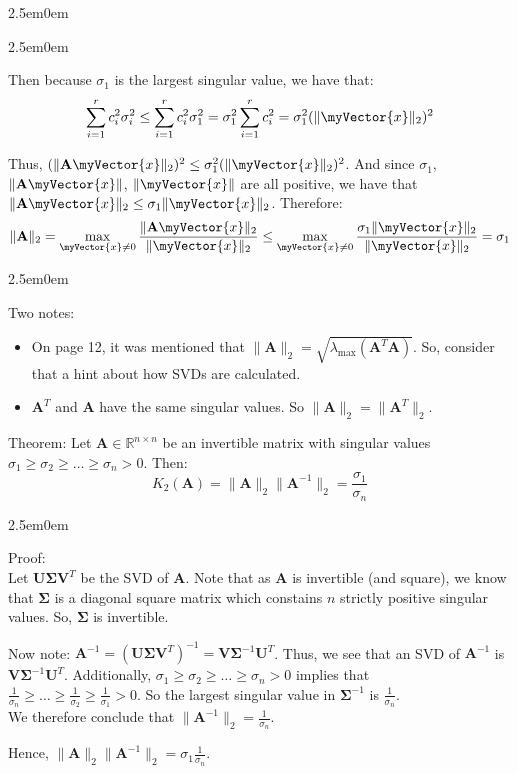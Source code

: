 \documentclass{book}
\newcommand{\hThree}{%
   \color{PineGreen}
   \fontsize{13}{15}\selectfont%
}
\newcommand{\hFour}{%
   \color{Cerulean}
   \fontsize{12}{14}\selectfont%
}
\newenvironment{myIndent}{%
   \begin{adjustwidth}{2.5em}{0em}%
}{%
   \end{adjustwidth}%
}
\newcommand{\uuline}[2][.]{%
{\vphantom{a}\color{#1}%
\rlap{\rule[-0.18em]{\widthof{#2}}{0.06em}}%
\rlap{\rule[-0.32em]{\widthof{#2}}{0.06em}}}%
#2}
\newcommand{\retTwo}{\hfill\bigbreak}
\newcommand{\mVec}[1]{\myVector{#1}}
\newcommand{\mMat}[1]{\mathbf{#1}}
\begin{document}
{\begin{myIndent}
{\begin{myIndent}
      Then because $\sigma_1$ is the largest singular value, we have that:
      \[\sum\limits_{i=1}^r{c_i^2\sigma_i^2} \leq \sum\limits_{i=1}^r{c_i^2\sigma_1^2} = \sigma_1^2\sum\limits_{i=1}^r{c_i^2} = \sigma_1^2(\|\mVec{x}\|_2)^2 \]

      Thus, $(\|\mMat{A}\mVec{x}\|_2)^2 \leq \sigma_1^2(\|\mVec{x}\|_2)^2$. And since $\sigma_1$, $\|\mMat{A}\mVec{x}\|$, $\|\mVec{x}\|$ are all positive, we have that $\|\mMat{A}\mVec{x}\|_2 \leq \sigma_1\|\mVec{x}\|_2$. Therefore:
      \[\|\mMat{A}\|_2 = \max\limits_{\mVec{x} \neq 0}{\frac{\|\mMat{A}\mVec{x}\|_2}{\|\mVec{x}\|_2}} \leq \max\limits_{\mVec{x} \neq 0}{\frac{\sigma_1\|\mVec{x}\|_2}{\|\mVec{x}\|_2}} = \sigma_1\]

      
      {\begin{myIndent} \hFour
         Two notes:
         \begin{itemize}
            \item On page 12, it was mentioned that $\| \mMat{A} \|_2 = \sqrt{\lambda_{\max}(\mMat{A}^T\mMat{A})}$. So, consider that a hint about how SVDs are calculated.
            
            \item $\mMat{A}^T$ and $\mMat{A}$ have the same singular values. So $\|\mMat{A}\|_2 = \|\mMat{A}^T\|_2$.
         \end{itemize}
      \end{myIndent}}
      \end{myIndent}}
      \retTwo

      \uuline{Theorem}: Let $\mMat{A} \in \mathbb{R}^{n \times n}$ be an invertible matrix with singular values\\ $\sigma_1 \geq \sigma_2 \geq \ldots \geq \sigma_n > 0$. Then:
      \[K_2(\mMat{A}) = \|\mMat{A}\|_2\|\mMat{A}^{-1}\|_2 = \frac{\sigma_1}{\sigma_n}\]

      
      {\begin{myIndent} \hThree
         Proof:\\
         Let $\mMat{U}\bm{\Sigma}\mMat{V}^T$ be the SVD of $\mMat{A}$. Note that as $\mMat{A}$ is invertible (and square), we know that $\bm{\Sigma}$ is a diagonal square matrix which constains $n$ strictly positive singular values. So, $\bm{\Sigma}$ is invertible. \retTwo

         Now note: $\mMat{A}^{-1} = (\mMat{U}\bm{\Sigma}\mMat{V}^T)^{-1} = \mMat{V}\bm{\Sigma}^{-1}\mMat{U}^T$. Thus, we see that an SVD of $\mMat{A}^{-1}$ is $\mMat{V}\bm{\Sigma}^{-1}\mMat{U}^T$. Additionally, $\sigma_1 \geq \sigma_2 \geq \ldots \geq \sigma_n > 0$ implies that\\ $\frac{1}{\sigma_n} \geq \ldots \geq \frac{1}{\sigma_2} \geq \frac{1}{\sigma_1} > 0$. So the largest singular value in $\bm{\Sigma}^{-1}$ is $\frac{1}{\sigma_n}$.\\ We therefore conclude that $\|\mMat{A}^{-1}\|_2 = \frac{1}{\sigma_n}$. \retTwo

         Hence, $\|\mMat{A}\|_2\|\mMat{A}^{-1}\|_2 = \sigma_1\frac{1}{\sigma_n}$.
      \end{myIndent}}

      \newpage

   \end{myIndent}}
\end{document}
